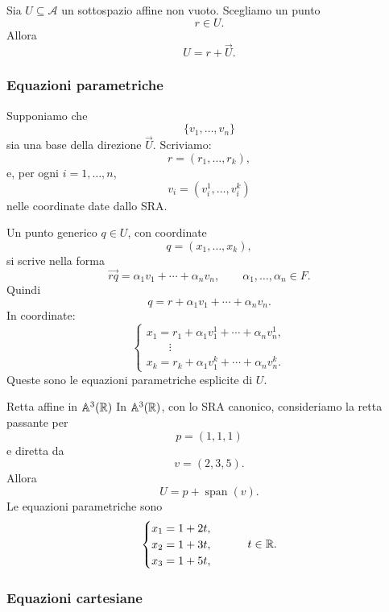 \documentclass[a4paper]{article}
\begin{document}
Sia \(U\subseteq\mathcal{A}\) un sottospazio affine non vuoto. Scegliamo un punto
\[
    r\in U.
\]
Allora
\[
    U=r+\overrightarrow{U}.
\]

\subsubsection{Equazioni parametriche}

Supponiamo che
\[
    \{v_1,\ldots,v_n\}
\]
sia una base della direzione \(\overrightarrow{U}\). Scriviamo:
\[
    r=(r_1,\ldots,r_k),
\]
e, per ogni \(i=1,\ldots,n\),
\[
    v_i=(v_i^1,\ldots,v_i^k)
\]
nelle coordinate date dallo SRA.

Un punto generico \(q\in U\), con coordinate
\[
    q=(x_1,\ldots,x_k),
\]
si scrive nella forma
\[
    \overrightarrow{rq}
    =
    \alpha_1v_1+\cdots+\alpha_nv_n,
    \qquad
    \alpha_1,\ldots,\alpha_n\in F.
\]
Quindi
\[
    q=r+\alpha_1v_1+\cdots+\alpha_nv_n.
\]
In coordinate:
\[
    \begin{cases}
        x_1=r_1+\alpha_1v_1^1+\cdots+\alpha_nv_n^1,\\
        \qquad\vdots\\
        x_k=r_k+\alpha_1v_1^k+\cdots+\alpha_nv_n^k.
    \end{cases}
\]
Queste sono le equazioni parametriche esplicite di \(U\).

\begin{snippetexample}{Retta affine in \(\mathbb{A}^3(\mathbb{R})\)}
    In \(\mathbb{A}^3(\mathbb{R})\), con lo SRA canonico, consideriamo la retta passante per
    \[
        p=(1,1,1)
    \]
    e diretta da
    \[
        v=(2,3,5).
    \]
    Allora
    \[
        U=p+\operatorname{span}(v).
    \]
    Le equazioni parametriche sono
    \[
        \begin{cases}
            x_1=1+2t,\\
            x_2=1+3t,\\
            x_3=1+5t,
        \end{cases}
        \qquad
        t\in\mathbb{R}.
    \]
\end{snippetexample}

\subsubsection{Equazioni cartesiane}
\end{document}
